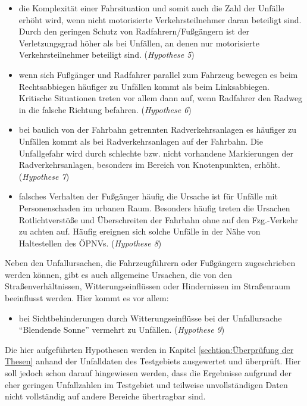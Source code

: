 \begin{itemize}
	\item die Komplexität einer Fahrsituation und somit auch die Zahl der Unfälle erhöht wird, wenn nicht motorisierte Verkehrsteilnehmer daran beteiligt sind. Durch den geringen Schutz von Radfahrern/Fußgängern ist der Verletzungsgrad höher als bei Unfällen, an denen nur motorisierte Verkehrsteilnehmer beteiligt sind. (\textit{Hypothese 5})
	\item wenn sich Fußgänger und Radfahrer parallel zum Fahrzeug bewegen es beim Rechtsabbiegen häufiger zu Unfällen kommt als beim Linksabbiegen. Kritische Situationen treten vor allem dann auf, wenn Radfahrer den Radweg in die falsche Richtung befahren. (\textit{Hypothese 6})
	\item bei baulich von der Fahrbahn getrennten Radverkehrsanlagen es häufiger zu Unfällen kommt als bei Radverkehrsanlagen auf der Fahrbahn. Die Unfallgefahr wird durch schlechte bzw. nicht vorhandene Markierungen der Radverkehrsanlagen, besonders im Bereich von Knotenpunkten, erhöht. (\textit{Hypothese 7})
	\item falsches Verhalten der Fußgänger häufig die Ursache ist für Unfälle mit Personenschaden im urbanen Raum. Besonders häufig treten die Ursachen Rotlichtverstöße und Überschreiten der Fahrbahn ohne auf den Fzg.-Verkehr zu achten auf. Häufig ereignen sich solche Unfälle in der Nähe von Haltestellen des ÖPNVs. (\textit{Hypothese 8})
\end{itemize}	

Neben den Unfallursachen, die Fahrzeugführern oder Fußgängern zugeschrieben werden können, gibt es auch allgemeine Ursachen, die von den Straßenverhältnissen, Witterungseinflüssen oder Hindernissen im Straßenraum beeinflusst werden. Hier kommt es vor allem: 

\begin{itemize}	
	\item bei Sichtbehinderungen durch Witterungseinflüsse bei der Unfallursache \enquote{Blendende Sonne} vermehrt zu Unfällen. (\textit{Hypothese 9})
\end{itemize}

Die hier aufgeführten Hypothesen werden in Kapitel \ref{sechtion:Überprüfung der Thesen} anhand der Unfalldaten des Testgebiets ausgewertet und überprüft. Hier soll jedoch schon darauf hingewiesen werden, dass die Ergebnisse aufgrund der eher geringen Unfallzahlen im Testgebiet und teilweise unvollständigen Daten nicht vollständig auf andere Bereiche übertragbar sind.


